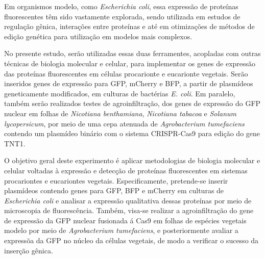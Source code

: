 Em organismos modelo, como \textit{Escherichia coli}, essa expressão de proteínas fluorescentes têm sido vastamente explorada, sendo utilizada em estudos de regulação gênica, interações entre proteínas e até em otimizações de métodos de edição genética para utilização em modelos mais complexos. 

No presente estudo, serão utilizadas essas duas ferramentes, acopladas com outras técnicas de biologia molecular e celular, para implementar os genes de expressão das proteínas fluorescentes em células procarionte e eucarionte vegetais. Serão inseridos genes de expressão para GFP, mCherry e BFP, a partir de plasmídeos geneticamente modificados, em culturas de bactérias \textit{E. coli}. Em paralelo, também serão realizados testes de agroinfiltração, dos genes de expressão do GFP nuclear em folhas de \textit{Nicotiana benthamiana}, \textit{Nicotiana tabacoa} e \textit{Solanum lycopersicum}, por meio de uma cepa atenuada de \textit{Agrobacterium tumefaciens} contendo um plasmídeo binário com o sistema CRISPR-Cas9 para edição do gene TNT1.

O objetivo geral deste experimento é aplicar metodologias de biologia molecular e celular voltadas à expressão e detecção de proteínas fluorescentes em sistemas procariontes e eucariontes vegetais. Especificamente, pretende-se inserir plasmídeos contendo genes para GFP, BFP e mCherry em culturas de \textit{Escherichia coli}  e analisar a expressão qualitativa dessas proteínas por meio de microscopia de fluorescência. Também, visa-se realizar a  agroinfiltração do gene de expressão da GFP nuclear fusionada á Cas9 em folhas de espécies vegetais modelo por meio de \textit{Agrobacterium tumefaciens}, e posteriormente avaliar a expressõa da GFP no núcleo da células vegetais, de modo a verificar o sucesso da inserção gênica. 
